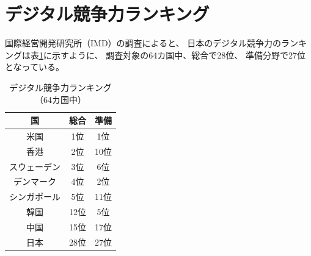 \documentclass[a4paper,11pt,dvipdfmx]{ujarticle}
\begin{document}
\section{デジタル競争力ランキング}

国際経営開発研究所（IMD）の調査\cite{imd}によると、
日本のデジタル競争力のランキングは表\ref{degirank}に示すように、
調査対象の64カ国中、総合で28位、
準備分野で27位となっている。

\begin{table}[htbp]
    \centering
    \caption{デジタル競争力ランキング（64カ国中）}
    \label{degirank}
    \begin{tabular}{|c|c|c|}
        \hline
         国 & 総合 & 準備 \\
         \hline
         米国 & 1位 & 1位 \\
         \hline
         香港 & 2位 & 10位 \\
         \hline
         スウェーデン & 3位 & 6位 \\
         \hline
         デンマーク & 4位 & 2位 \\
         \hline
         シンガポール & 5位 & 11位 \\
        \hline
         韓国 & 12位 & 5位 \\
         \hline
         中国 & 15位 & 17位 \\
         \hline
         日本 & 28位 & 27位 \\
         \hline
     \end{tabular}
\end{table}

\end{document}
